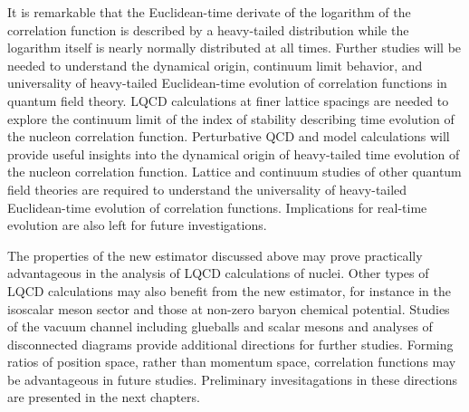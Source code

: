 It is remarkable that the Euclidean-time derivate of the logarithm of the correlation function is described by a heavy-tailed 
distribution while the logarithm itself is nearly normally distributed at all times. 
Further studies will be needed to understand the dynamical origin, continuum limit behavior, and universality of 
heavy-tailed Euclidean-time evolution of correlation functions in quantum field theory. 
LQCD calculations at finer lattice spacings are needed to explore the continuum limit of the index of stability 
describing time evolution of the nucleon correlation function. 
Perturbative QCD and model calculations will provide useful insights into the dynamical origin of heavy-tailed time 
evolution of the nucleon correlation function. 
Lattice and continuum studies of other quantum field theories are required to understand the universality of 
heavy-tailed Euclidean-time evolution of correlation functions. Implications for real-time evolution are also left for future investigations.

The properties of the new estimator discussed above may prove practically advantageous in the analysis of LQCD 
calculations of nuclei.
Other types of LQCD calculations may also benefit from the new estimator, for instance in the isoscalar meson 
sector and those at non-zero baryon chemical potential.
Studies of the vacuum channel including glueballs and scalar mesons and analyses of disconnected diagrams provide additional directions for further studies.
Forming ratios of position space, rather than momentum space, correlation functions may be advantageous in future studies.
Preliminary invesitagations in these directions are presented in the next chapters.


